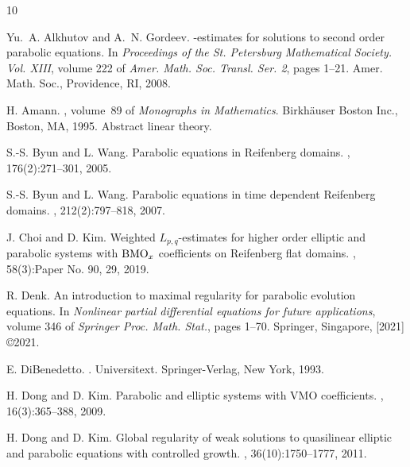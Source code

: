 \documentclass[reqno]{amsart}
\numberwithin{equation}{section}
\theoremstyle{plain}
\theoremstyle{definition}
\begin{document}





\def\cprime{$'$}
\begin{thebibliography}{10}

Yu.~A. Alkhutov and A.~N. Gordeev.
-estimates for solutions to second order parabolic equations.
\newblock In {\em Proceedings of the {S}t. {P}etersburg {M}athematical
  {S}ociety. {V}ol. {XIII}}, volume 222 of {\em Amer. Math. Soc. Transl. Ser.
  2}, pages 1--21. Amer. Math. Soc., Providence, RI, 2008.

H. Amann.
,
  volume~89 of {\em Monographs in Mathematics}.
\newblock Birkh\"auser Boston Inc., Boston, MA, 1995.
\newblock Abstract linear theory.

S.-S. Byun and L. Wang.
\newblock Parabolic equations in {R}eifenberg domains.
, 176(2):271--301, 2005.

S.-S. Byun and L. Wang.
\newblock Parabolic equations in time dependent {R}eifenberg domains.
, 212(2):797--818, 2007.

J. Choi and D. Kim.
\newblock Weighted {$L_{p,q}$}-estimates for higher order elliptic and
  parabolic systems with {${\rm BMO}_x$} coefficients on {R}eifenberg flat
  domains.
, 58(3):Paper No. 90,
  29, 2019.

R. Denk.
\newblock An introduction to maximal regularity for parabolic evolution
  equations.
\newblock In {\em Nonlinear partial differential equations for future
  applications}, volume 346 of {\em Springer Proc. Math. Stat.}, pages 1--70.
  Springer, Singapore, [2021] \copyright 2021.

E. DiBenedetto.
.
\newblock Universitext. Springer-Verlag, New York, 1993.

H. Dong and D. Kim.
\newblock Parabolic and elliptic systems with {VMO} coefficients.
, 16(3):365--388, 2009.

H. Dong and D. Kim.
\newblock Global regularity of weak solutions to quasilinear elliptic and
  parabolic equations with controlled growth.
, 36(10):1750--1777, 2011.


\end{thebibliography}
\end{document}
